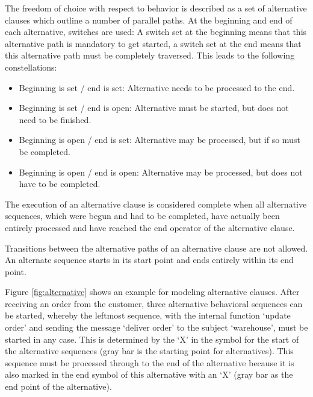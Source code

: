 The freedom of choice with respect to behavior is described as a set of alternative clauses which outline a number of parallel paths. At the beginning and end of each alternative, switches are used: A switch set at the beginning means that this alternative path is mandatory to get started, a switch set at the end means that this alternative path must be completely traversed. This leads to the following constellations:
\begin{itemize}
	\item Beginning is set / end is set: Alternative needs to be processed to the end.
	\item Beginning is set / end is open: Alternative must be started, but does not need to be finished. 
	\item Beginning is open / end is set: Alternative may be processed, but if so must be completed.
	\item Beginning is open / end is open: Alternative may be processed, but does not have to be completed.
\end{itemize}
The execution of an alternative clause is considered complete when all alternative sequences, which were begun and had to be completed, have actually been entirely processed and have reached the end operator of the alternative clause.

Transitions between the alternative paths of an alternative clause are not allowed. An alternate sequence starts in its start point and ends entirely within its end point.

Figure \ref{fig:alternative} shows an example for modeling alternative clauses. After receiving an order from the customer, three alternative behavioral sequences can be started, whereby the leftmost sequence, with the internal function ‘update order’ and sending the message ‘deliver order’ to the subject ‘warehouse’, must be started in any case. This is determined by the ‘X’ in the symbol for the start of the alternative sequences (gray bar is the starting point for alternatives). This sequence must be processed through to the end of the alternative because it is also marked in the end symbol of this alternative with an ‘X’ (gray bar as the end point of the alternative).

